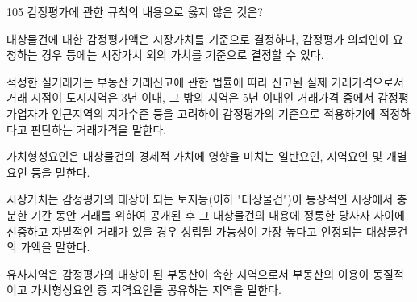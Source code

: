 \begin{question}{105}
감정평가에 관한 규칙의 내용으로 옳지 않은 것은?
\begin{choices}
  \item 대상물건에 대한 감정평가액은 시장가치를 기준으로 결정하나, 감정평가 의뢰인이 요청하는 경우 등에는 시장가치 외의 가치를 기준으로 결정할 수 있다.
  \item 적정한 실거래가는 부동산 거래신고에 관한 법률에 따라 신고된 실제 거래가격으로서 거래 시점이 도시지역은 3년 이내, 그 밖의 지역은 5년 이내인 거래가격 중에서 감정평가업자가 인근지역의 지가수준 등을 고려하여 감정평가의 기준으로 적용하기에 적정하다고 판단하는 거래가격을 말한다.
  \item 가치형성요인은 대상물건의 경제적 가치에 영향을 미치는 일반요인, 지역요인 및 개별요인 등을 말한다.
  \item 시장가치는 감정평가의 대상이 되는 토지등(이하 "대상물건")이 통상적인 시장에서 충분한 기간 동안 거래를 위하여 공개된 후 그 대상물건의 내용에 정통한 당사자 사이에 신중하고 자발적인 거래가 있을 경우 성립될 가능성이 가장 높다고 인정되는 대상물건의 가액을 말한다.
  \item 유사지역은 감정평가의 대상이 된 부동산이 속한 지역으로서 부동산의 이용이 동질적이고 가치형성요인 중 지역요인을 공유하는 지역을 말한다.
\end{choices}
\end{question}
